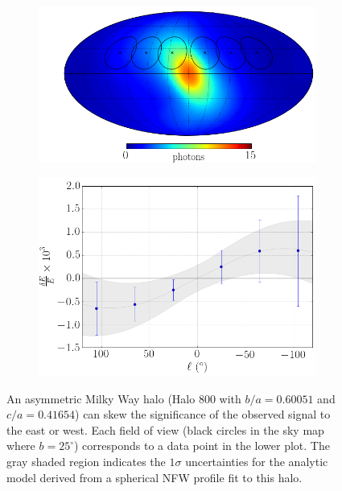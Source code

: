 \documentclass[aps,prd,10pt,twocolumn,superscriptaddress,showpacs]{revtex4-1}
\begin{document}
\begin{figure}[h!]
\centering
\begin{subfigure}[b]{1.0\columnwidth}
	\includegraphics[width=\textwidth]{flux_map_800.png}
\end{subfigure}
\par\medskip
\begin{subfigure}[b]{1.0\columnwidth}
	\includegraphics[width=\textwidth]{de_vs_l_800.png}
\end{subfigure}
\caption{An asymmetric Milky Way halo (Halo 800 with $b/a = 0.60051$ and $c/a = 0.41654$) can skew the significance of the
	observed signal to the east or west. Each field of view (black circles in the sky map where $b = 25^\circ$) corresponds to a data point in
the lower plot. The gray shaded region indicates the $1\sigma$ uncertainties for the analytic model
derived from a spherical NFW profile fit to this halo.}
\label{fig:triax}
\end{figure}
\end{document}
